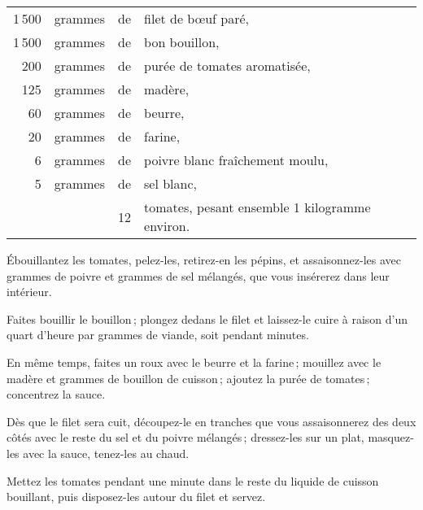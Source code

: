 \footnotesize
\begin{longtable}{rrrp{16em}}
  1 500 & grammes & de & filet de bœuf paré,                                                              \\
  1 500 & grammes & de & bon bouillon,                                                                    \\
    200 & grammes & de & purée de tomates aromatisée,                                                     \\
    125 & grammes & de & madère,                                                                          \\
     60 & grammes & de & beurre,                                                                          \\
     20 & grammes & de & farine,                                                                          \\
      6 & grammes & de & poivre blanc fraîchement moulu,                                                  \\
      5 & grammes & de & sel blanc,                                                                       \\
        &         & 12 & tomates, pesant ensemble 1 kilogramme environ.                                   \\
\end{longtable}
\normalsize

Ébouillantez les tomates, pelez-les, retirez-en les pépins, et assaisonnez-les
avec {\mmm} grammes de poivre et {\mmm} grammes de sel mélangés, que vous insérerez dans
leur intérieur.

Faites bouillir le bouillon ; plongez dedans le filet et laissez-le cuire
à raison d'un quart d'heure par {\mmm} grammes de viande, soit pendant {\mmm} minutes.

En même temps, faites un roux avec le beurre et la farine ; mouillez avec le
madère et {\mmm} grammes de bouillon de cuisson ; ajoutez la purée de tomates ;
concentrez la sauce.

Dès que le filet sera cuit, découpez-le en tranches que vous assaisonnerez des
deux côtés avec le reste du sel et du poivre mélangés ; dressez-les sur un
plat, masquez-les avec la sauce, tenez-les au chaud.

Mettez les tomates pendant une minute dans le reste du liquide de cuisson
bouillant, puis disposez-les autour du filet et servez.

